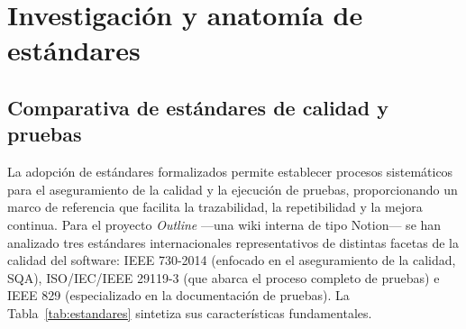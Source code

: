 \documentclass[12pt, letterpaper]{article}
\begin{document}
\section{Investigación y anatomía de estándares}

\subsection{Comparativa de estándares de calidad y pruebas}

La adopción de estándares formalizados permite establecer procesos sistemáticos para el aseguramiento de la calidad y la ejecución de pruebas, proporcionando un marco de referencia que facilita la trazabilidad, la repetibilidad y la mejora continua. Para el proyecto \textit{Outline} —una wiki interna de tipo Notion— se han analizado tres estándares internacionales representativos de distintas facetas de la calidad del software: IEEE 730-2014 (enfocado en el aseguramiento de la calidad, SQA), ISO/IEC/IEEE 29119-3 (que abarca el proceso completo de pruebas) e IEEE 829 (especializado en la documentación de pruebas). La Tabla~\ref{tab:estandares} sintetiza sus características fundamentales.
\end{document}
